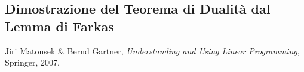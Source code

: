 \documentclass[italian, letter paper, 12pt, reqno]{article}
\theoremstyle{myteo}
\numberwithin{equation}{section}
\begin{document}
\subsection{Dimostrazione del Teorema di Dualità dal Lemma di Farkas}
\label{subsec:dim_dualità}

\begin{thebibliography}{1}
  Jiri Matousek \& Bernd Gartner,
  \textit{Understanding and Using Linear Programming},
  Springer,
  2007.
\end{thebibliography}
\end{document}
